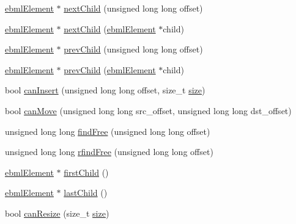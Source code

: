 \begin{DoxyCompactItemize}
\item 
\mbox{\hyperlink{classebml_1_1ebmlElement}{ebml\+Element}} $\ast$ \mbox{\hyperlink{classebml_1_1ebmlLazyLoadMasterElement_a86b296ca3474853393afd9243fcc7928}{next\+Child}} (unsigned long long offset)
\item 
\mbox{\hyperlink{classebml_1_1ebmlElement}{ebml\+Element}} $\ast$ \mbox{\hyperlink{classebml_1_1ebmlLazyLoadMasterElement_ab861c67fa04781bec588c870948e45ea}{next\+Child}} (\mbox{\hyperlink{classebml_1_1ebmlElement}{ebml\+Element}} $\ast$child)
\item 
\mbox{\hyperlink{classebml_1_1ebmlElement}{ebml\+Element}} $\ast$ \mbox{\hyperlink{classebml_1_1ebmlLazyLoadMasterElement_a793fdd82ff0696323f82ecd195982cdf}{prev\+Child}} (unsigned long long offset)
\item 
\mbox{\hyperlink{classebml_1_1ebmlElement}{ebml\+Element}} $\ast$ \mbox{\hyperlink{classebml_1_1ebmlLazyLoadMasterElement_a459519a38cb5d43c22d4c08fea1ff75e}{prev\+Child}} (\mbox{\hyperlink{classebml_1_1ebmlElement}{ebml\+Element}} $\ast$child)
\item 
bool \mbox{\hyperlink{classebml_1_1ebmlLazyLoadMasterElement_a8d9bbc37b827fdc80e4e81060ac827d7}{can\+Insert}} (unsigned long long offset, size\+\_\+t \mbox{\hyperlink{namespaceebml_a75eaf24de9c90584c60e27de3b1dd63e}{size}})
\item 
bool \mbox{\hyperlink{classebml_1_1ebmlLazyLoadMasterElement_a269975b1519259599b771dad3607f13a}{can\+Move}} (unsigned long long src\+\_\+offset, unsigned long long dst\+\_\+offset)
\item 
unsigned long long \mbox{\hyperlink{classebml_1_1ebmlLazyLoadMasterElement_a561dfa38f015a5445f4db4b10b46f821}{find\+Free}} (unsigned long long offset)
\item 
unsigned long long \mbox{\hyperlink{classebml_1_1ebmlLazyLoadMasterElement_a60d9ff3efbee6cca4b88c00556a865a9}{rfind\+Free}} (unsigned long long offset)
\item 
\mbox{\hyperlink{classebml_1_1ebmlElement}{ebml\+Element}} $\ast$ \mbox{\hyperlink{classebml_1_1ebmlLazyLoadMasterElement_abb22d3f258960aa2611ecd4ab89bf5e7}{first\+Child}} ()
\item 
\mbox{\hyperlink{classebml_1_1ebmlElement}{ebml\+Element}} $\ast$ \mbox{\hyperlink{classebml_1_1ebmlLazyLoadMasterElement_aa49c1fe12fb58301bcbd3adf642ce162}{last\+Child}} ()
\item 
bool \mbox{\hyperlink{classebml_1_1ebmlLazyLoadMasterElement_a7e460d463de077b1a7ed5c12fffd2a49}{can\+Resize}} (size\+\_\+t \mbox{\hyperlink{namespaceebml_a75eaf24de9c90584c60e27de3b1dd63e}{size}})

\end{DoxyCompactItemize}
